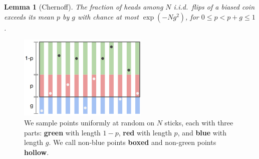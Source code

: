 \documentclass[11pt, justified]{tufte-book}
\newtheorem*{lem}{Lemma}
\theoremstyle{definition}
\begin{document}
        \begin{lem}[Chernoff]
            The fraction of heads among $N$ i.i.d.\ flips of a biased coin
            exceeds its mean $p$ by $g$ with chance at most 
            $\exp(-Ng^2)$, for $0 \leq p < p+g \leq 1$.
        \end{lem}
        \vspace{-0.5cm}
        \begin{figure}[h]
            \centering
            \includegraphics[height=4cm, clip]{chernoff}
            \caption{{
                We sample points uniformly at random on $N$
                sticks, each with three parts: \textbf{green}
                with length $1-p$, \textbf{red} with length $p$, and
                \textbf{blue} with length $g$.  We call non-blue points
                \textbf{boxed} and non-green points \textbf{hollow}.
            }}
            \label{fig:chernoff}
        \end{figure}
        \vspace{-0.5cm}
\end{document}
